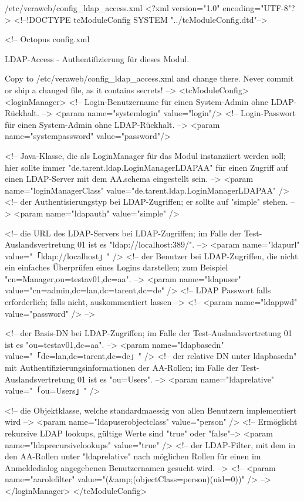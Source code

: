 \begin{lstdump}[basicstyle=\ttfamily\footnotesize]{/etc/veraweb/config_ldap_access.xml}
<?xml version="1.0" encoding="UTF-8"?>
<!--!DOCTYPE tcModuleConfig SYSTEM "../tcModuleConfig.dtd"-->

<!--
	Octopus config.xml

	LDAP-Access - Authentifizierung für dieses Modul.

	Copy to /etc/veraweb/config_ldap_access.xml and change there.
	Never commit or ship a changed file, as it contains secrets!
-->
<tcModuleConfig>
	<loginManager>
		<!-- Login-Benutzername für einen System-Admin ohne LDAP-Rückhalt. -->
		<param name="systemlogin" value="login"/>
		<!-- Login-Passwort für einen System-Admin ohne LDAP-Rückhalt. -->
		<param name="systempassword" value="password"/>

		<!-- Java-Klasse, die als LoginManager für das Modul instanziiert werden soll; hier sollte immer "de.tarent.ldap.LoginManagerLDAPAA" für einen Zugriff auf einen LDAP-Server mit dem AA.schema eingestellt sein. -->
		<param name="loginManagerClass" value="de.tarent.ldap.LoginManagerLDAPAA" />
		<!-- der Authentisierungstyp bei LDAP-Zugriffen; er sollte auf "simple" stehen. -->
		<param name="ldapauth" value="simple" />

		<!-- die URL des LDAP-Servers bei LDAP-Zugriffen; im Falle der Test-Auslandsvertretung 01 ist es "ldap://localhost:389/". -->
		<param name="ldapurl" value="「ldap://localhost」" />
		<!-- der Benutzer bei LDAP-Zugriffen, die nicht ein einfaches Überprüfen eines Logins darstellen; zum Beispiel "cn=Manager,ou=testav01,dc=aa". -->
		<param name="ldapuser" value="cn=admin,dc=lan,dc=tarent,dc=de" />
		<!-- LDAP Passwort falls erforderlich; falls nicht, auskommentiert lassen -->
		<!-- <param name="ldappwd" value="password" /> -->

		<!-- der Basis-DN bei LDAP-Zugriffen; im Falle der Test-Auslandsvertretung 01 ist es "ou=testav01,dc=aa". -->
		<param name="ldapbasedn" value="「dc=lan,dc=tarent,dc=de」" />
		<!-- der relative DN unter ldapbasedn" mit Authentifizierungsinformationen der AA-Rollen; im Falle der Test-Auslandsvertretung 01 ist es "ou=Users". -->
		<param name="ldaprelative" value="「ou=Users」" />

		<!-- die Objektklasse, welche standardmaessig von allen Benutzern implementiert wird -->
		<param name="ldapuserobjectclass" value="person" />
		<!-- Ermöglicht rekursive LDAP lookups, gültige Werte sind "true" oder "false"-->
		<param name="ldaprecursivelookups" value="true" />
		<!-- der LDAP-Filter, mit dem in den AA-Rollen unter "ldaprelative" nach möglichen Rollen für einen im Anmeldedialog angegebenen Benutzernamen gesucht wird. -->
		<!-- <param name="aarolefilter" value="(&amp;(objectClass=person)(uid={0}))" /> -->
	</loginManager>
</tcModuleConfig>
\end{lstdump}

